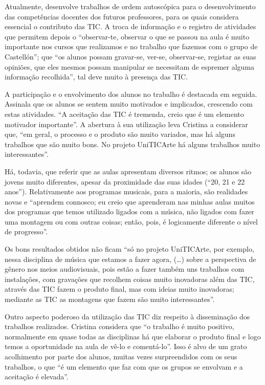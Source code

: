 \documentclass{textolivre}
\begin{document}
Atualmente, desenvolve trabalhos de ordem autoscópica para o desenvolvimento
das competências docentes dos futuros professores, para os quais considera
essencial o contributo das TIC. A troca de informação e o registro de
atividades que permitem depois o “observar-te, observar o que se passou na aula
é muito importante nos cursos que realizamos e no trabalho que fazemos com o
grupo de Castellón”; que “os alunos possam gravar-se, ver-se, observar-se,
registar as suas opiniões, que eles mesmos possam manipular se necessitam de
espremer alguma informação recolhida”, tal deve muito à presença das TIC.

A participação e o envolvimento dos alunos no trabalho é destacada em seguida.
Assinala que os alunos se sentem muito motivados e implicados, crescendo com
estas atividades. “A aceitação das TIC é tremenda, creio que é um elemento
motivador importante”. A abertura à sua utilização leva Cristina a considerar
que, “em geral, o processo e o produto são muito variados, mas há alguns
trabalhos que são muito bons. No projeto UniTICArte há alguns trabalhos muito
interessantes”.

Há, todavia, que referir que as aulas apresentam diversos ritmos; os alunos são
jovens muito diferentes, apesar da proximidade das suas idades (“20, 21 e 22
anos”). Relativamente aos programas musicais, para a maioria, são realidades
novas e “aprendem connosco; eu creio que aprenderam nas minhas aulas muitos dos
programas que temos utilizado ligados com a música, não ligados com fazer uma
montagem ou com outras coisas; então, pois, é logicamente diferente o nível de
progresso”.

Os bons resultados obtidos não ficam “só no projeto UniTICArte, por exemplo,
nessa disciplina de música que estamos a fazer agora, (\ldots) sobre a perspectiva
de gênero nos meios audiovisuais, pois estão a fazer também uns trabalhos com
instalações, com gravações que recolhem coisas muito inovadoras além das TIC,
através das TIC fazem o produto final, mas com ideias muito inovadoras;
mediante as TIC as montagens que fazem são muito interessantes”.

Outro aspecto poderoso da utilização das TIC diz respeito à disseminação dos
trabalhos realizados. Cristina considera que “o trabalho é muito positivo,
normalmente em quase todas as disciplinas há que elaborar o produto final e
logo temos a oportunidade na aula de vê-lo e comentá-lo”. Isso é alvo de um
grato acolhimento por parte dos alunos, muitas vezes surpreendidos com os seus
trabalhos, o que “é um elemento que faz com que os grupos se envolvam e a
aceitação é elevada”.
\end{document}

